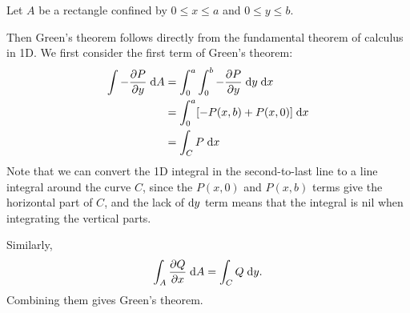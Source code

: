 \documentclass[a4paper]{article}
\begin{document}
\begin{eg}
  Let $A$ be a rectangle confined by $0 \leq x \leq a$ and $0 \leq y \leq b$.
  \begin{center}
  \end{center}
  Then Green's theorem follows directly from the fundamental theorem of calculus in 1D. We first consider the first term of Green's theorem:
  \begin{align*}
    \int -\frac{\partial P}{\partial y} \;\mathrm{d} A &= \int_0^a \int_0^b -\frac{\partial P}{\partial y}\;\mathrm{d} y\;\mathrm{d} x\\
    &= \int_0^a [-P(x, b) + P(x, 0)]\;\mathrm{d} x\\
    &= \int_C P\;\mathrm{d} x
  \end{align*}
  Note that we can convert the 1D integral in the second-to-last line to a line integral around the curve $C$, since the $P(x, 0)$ and $P(x, b)$ terms give the horizontal part of $C$, and the lack of $\mathrm{d} y$ term means that the integral is nil when integrating the vertical parts.

  Similarly,
  \[
    \int_A \frac{\partial Q}{\partial x}\;\mathrm{d} A = \int_C Q\;\mathrm{d} y.
  \]
  Combining them gives Green's theorem.
\end{eg}
\end{document}
